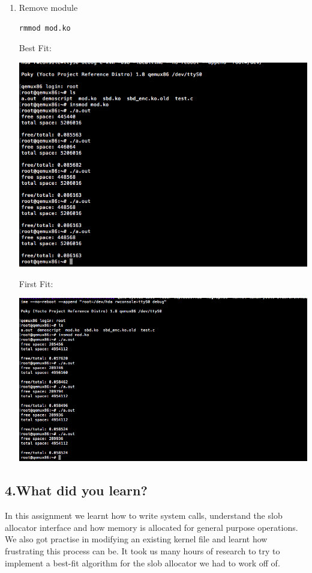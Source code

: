 \documentclass[onecolumn, draftclsnofoot,10pt, compsoc]{IEEEtran}
\begin{document}
\begin{enumerate}
  \item Remove module
  \begin{lstlisting}
rmmod mod.ko
\end{lstlisting}


Best Fit:

\includegraphics[width=\linewidth]{best-fit.png}

First Fit:

\includegraphics[width=\linewidth]{first-fit.png}


	\end{enumerate}

	\subsection*{4.What did you learn?}
  In this assignment we learnt how to write system calls, understand the slob allocator interface and how memory is allocated for general purpose operations. We also got practise in modifying an existing kernel file and learnt how frustrating this process can be. It took us many hours of research to try to implement a best-fit algorithm for the slob allocator  we had to work off of.
\end{document}
